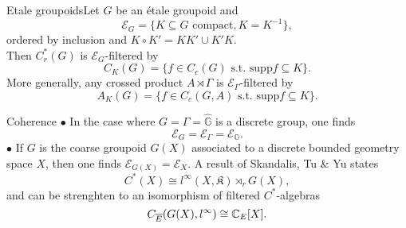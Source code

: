\begin{frame}{Etale groupoids}Let $G$ be an étale groupoid and
\[\mathcal E_G = \{K\subseteq G \text{ compact}, K= K^{-1}\},\]
ordered by inclusion and $K\circ K' = KK' \cup K'K$.\\
 \vspace{0.4in}
Then $C_r^*(G)$ is $\mathcal E_{G}$-filtered by  
\[C_K (G)= \{ f\in C_c(G) \text{ s.t. supp}f\subseteq K \}.\]
More generally, any crossed product $A\rtimes \Gamma$ is $\mathcal E_{\Gamma}$-filtered by
\[A_K(G)= \{ f\in C_c(G,A) \text{ s.t. supp}f\subseteq K \}.\]
\end{frame}

\begin{frame}{Coherence}
$\bullet$ In the case where $G=\Gamma = \hat{\mathbb G}$ is a discrete group, one finds  
\[\mathcal E_G = \mathcal E_\Gamma = \mathcal E_{\mathbb G}.\]
$\bullet$ If $G$ is the coarse groupoid $G(X)$ associated to a discrete bounded geometry space $X$, then one finds $\mathcal E_{G(X)} = \mathcal E_X$. A result of Skandalis, Tu \& Yu states 
\[C^*(X) \cong l^\infty (X,\mathfrak K) \rtimes_r G(X),\]
and can be strenghten to an isomorphism of filtered $C^*$-algebras
\[C_{\overline E}(G(X), l^\infty ) \cong \mathbb C_{E}[X].\] 

\end{frame}